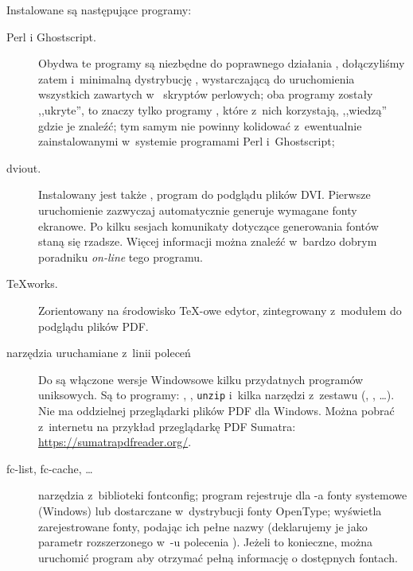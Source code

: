 \documentclass{article}
\begin{document}
Instalowane są następujące programy:
\begin{description}
\item[Perl i Ghostscript.] Obydwa te programy są niezbędne do
poprawnego działania \TL{}, dołączyliśmy zatem 
i~minimalną dystrybucję , wystarczającą do
uruchomienia wszystkich zawartych w~\TL{} skryptów perlowych;
oba programy zostały ,,ukryte'', to znaczy tylko programy \TL{}, które
z~nich korzystają, ,,wiedzą'' gdzie je znaleźć; tym samym nie powinny
kolidować z~ewentualnie zainstalowanymi w~systemie programami Perl
i~Ghostscript;
%

\item[dviout.] Instalowany jest także  , program do podglądu
plików DVI. Pierwsze uruchomienie  zazwyczaj automatycznie
generuje wymagane fonty ekranowe. Po kilku sesjach komunikaty dotyczące
generowania fontów staną się  rzadsze. Więcej informacji można znaleźć
w~bardzo dobrym poradniku \emph{on-line} tego programu.
\item[\TeX{}works.] Zorientowany na środowisko \TeX-owe edytor, zintegrowany
z~modułem do podglądu plików PDF.
\item[narzędzia uruchamiane z~linii poleceń] Do \TL{} są włączone
 wersje Windowsowe
 kilku przydatnych programów uniksowych. Są to programy: , , \texttt{unzip}  i~kilka narzędzi z~zestawu  (, , \ldots). Nie ma oddzielnej przeglądarki plików PDF dla Windows.
 Można pobrać z~internetu  na przykład przeglądarkę   PDF Sumatra:
  \url{https://sumatrapdfreader.org/}.
\item[fc-list, fc-cache, \ldots] narzędzia z~biblioteki fontconfig; program
 rejestruje dla \XeTeX-a fonty systemowe (Windows) lub dostarczane
 w~dystrybucji \TL{} fonty OpenType;  wyświetla zarejestrowane
 fonty, podając ich pełne nazwy (deklarujemy je jako parametr rozszerzonego
 w~\XeTeX-u polecenia ). Jeżeli to konieczne, można uruchomić program  aby otrzymać pełną informację o dostępnych fontach.
\end{description}
\end{document}
